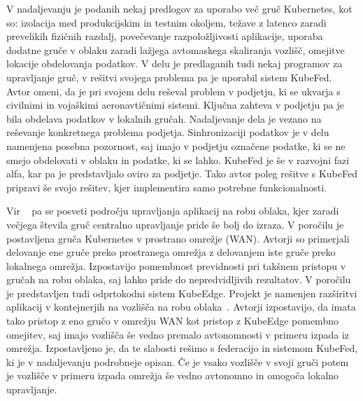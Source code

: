 \documentclass[a4paper, 12pt]{book}
\begin{document}
V nadaljevanju je podanih nekaj predlogov za uporabo več gruč Kubernetes, kot so: izolacija med produkcijskim in testnim okoljem, težave z latenco zaradi prevelikih fizičnih razdalj, povečevanje razpoložljivosti aplikacije, uporaba dodatne gruče v oblaku zaradi lažjega avtomaskega skaliranja vozlišč, omejitve lokacije obdelovanja podatkov.
V delu je predlaganih tudi nekaj programov za upravljanje gruč, v rešitvi svojega problema pa je uporabil sistem KubeFed.
Avtor omeni, da je pri svojem delu reševal problem v podjetju, ki se ukvarja s civilnimi in vojaškimi aeronavtičnimi sistemi.
Ključna zahteva v podjetju pa je bila obdelava podatkov v lokalnih gručah.
Nadaljevanje dela je vezano na reševanje konkretnega problema podjetja.
Sinhronizaciji podatkov je v delu namenjena posebna pozornost, saj imajo v podjetju označene podatke, ki se ne smejo obdelovati v oblaku in podatke, ki se lahko.
KubeFed je še v razvojni fazi alfa, kar pa je predstavljalo oviro za podjetje.
Tako avtor poleg rešitve s KubeFed pripravi še svojo rešitev, kjer implementira samo potrebne funkcionalnosti.

Vir ~\cite{kube-and-edge} pa se posveti področju upravljanja aplikacij na robu oblaka, kjer zaradi večjega števila gruč centralno upravljanje pride še bolj do izraza.
V poročilu je postavljena gruča Kubernetes v prostrano omrežje (WAN).
Avtorji so primerjali delovanje ene gruče preko prostranega omrežja z delovanjem iste gruče preko lokalnega omrežja.
Izpostavijo pomembnost previdnosti pri takšnem pristopu v gručah na robu oblaka, saj lahko pride do nepredvidljivih rezultatov.
V poročilu je predstavljen tudi odprtokodni sistem KubeEdge.
Projekt je namenjen razširitvi aplikacij v kontejnerjih na vozlišča na robu oblaka~\cite{kubeedge}.
Avtorji izpostavijo, da imata tako pristop z eno gručo v omrežju WAN kot pristop z KubeEdge pomembno omejitev, saj imajo vozlišča še vedno premalo avtonomnosti v primeru izpada iz omrežja.
Izpostavljeno je, da te slabosti rešimo s federacijo in sistemom KubeFed, ki je v nadaljevanju podrobneje opisan.
Če je vsako vozlišče v svoji gruči potem je vozlišče v primeru izpada omrežja še vedno avtonomno in omogoča lokalno upravljanje.
\end{document}
